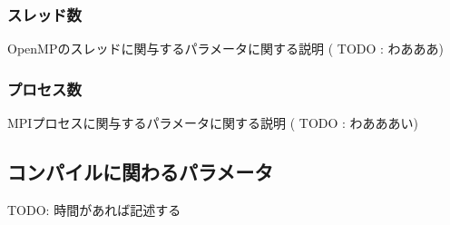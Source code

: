 \subsubsection{スレッド数}
OpenMPのスレッドに関与するパラメータに関する説明 ( TODO : わあああ)
\subsubsection{プロセス数}
MPIプロセスに関与するパラメータに関する説明 ( TODO : わあああい)
\subsection{コンパイルに関わるパラメータ}
TODO: 時間があれば記述する
